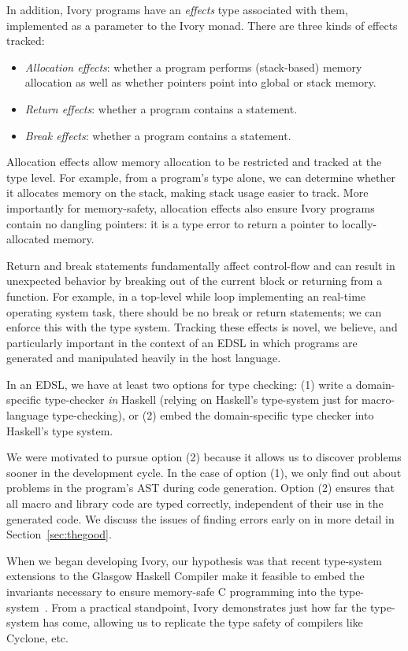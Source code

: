 In addition, Ivory programs have an \emph{effects} type associated with them,
implemented as a parameter to the Ivory monad.  There are three kinds of effects
tracked:
\begin{itemize}
  \item \emph{Allocation effects}: whether a program performs (stack-based)
    memory allocation as well as whether pointers point into global or stack memory.
  \item \emph{Return effects}: whether a program contains a  statement.
  \item \emph{Break effects}: whether a program contains a 
    statement.
\end{itemize}
\noindent
Allocation effects allow memory allocation to be restricted and tracked at the
type level.  For example, from a program's type alone, we can determine whether
it allocates memory on the stack, making stack usage easier to track.  More
importantly for memory-safety, allocation effects also ensure Ivory programs
contain no dangling pointers: it is a type error to return a pointer to
locally-allocated memory.

Return and break statements fundamentally affect control-flow and can result in
unexpected behavior by breaking out of the current block or returning from a
function.  For example, in a top-level while loop implementing an real-time
operating system task, there should be no break or return statements; we can
enforce this with the type system.  Tracking these effects is novel, we believe,
and particularly important in the context of an EDSL in which programs are
generated and manipulated heavily in the host language.

In an EDSL, we have at least two options for type checking: (1) write a
domain-specific type-checker \emph{in} Haskell (relying on Haskell's type-system
just for macro-language type-checking), or (2) embed the domain-specific type
checker into Haskell's type system.

We were motivated to pursue option (2) because it allows us to discover problems
sooner in the development cycle. In the case of option (1), we only find out
about problems in the program's AST during code generation. Option (2) ensures
that all macro and library code are typed correctly, independent of their use in
the generated code. We discuss the issues of finding errors early on in more
detail in Section~\ref{sec:thegood}.

When we began developing Ivory, our hypothesis  was that recent type-system
extensions to the Glasgow Haskell Compiler make it feasible to embed the
invariants necessary to ensure memory-safe C programming into the
type-system~\cite{dephaskell}. From a practical standpoint, Ivory demonstrates
just how far the type-system has come, allowing us to replicate the type safety
of compilers like Cyclone, etc.

